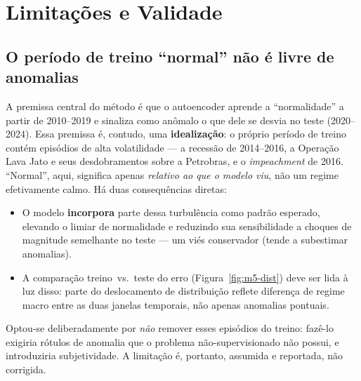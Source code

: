 \section{Limitações e Validade}
\label{sec:limitacoes}

\subsection{O período de treino ``normal'' não é livre de anomalias}
A premissa central do método é que o autoencoder aprende a ``normalidade'' a partir de
2010--2019 e sinaliza como anômalo o que dele se desvia no teste (2020--2024). Essa premissa
é, contudo, uma \textbf{idealização}: o próprio período de treino contém episódios de alta
volatilidade --- a recessão de 2014--2016, a Operação Lava Jato e seus desdobramentos sobre a
Petrobras, e o \emph{impeachment} de 2016. ``Normal'', aqui, significa apenas
\emph{relativo ao que o modelo viu}, não um regime efetivamente calmo. Há duas consequências
diretas:
\begin{itemize}[noitemsep]
  \item O modelo \textbf{incorpora} parte dessa turbulência como padrão esperado, elevando o
        limiar de normalidade e reduzindo sua sensibilidade a choques de magnitude semelhante
        no teste --- um viés conservador (tende a subestimar anomalias).
  \item A comparação treino~vs.~teste do erro (Figura~\ref{fig:m5-dist}) deve ser lida à luz
        disso: parte do deslocamento de distribuição reflete diferença de regime macro entre
        as duas janelas temporais, não apenas anomalias pontuais.
\end{itemize}
Optou-se deliberadamente por \emph{não} remover esses episódios do treino: fazê-lo exigiria
rótulos de anomalia que o problema não-supervisionado não possui, e introduziria
subjetividade. A limitação é, portanto, assumida e reportada, não corrigida.

